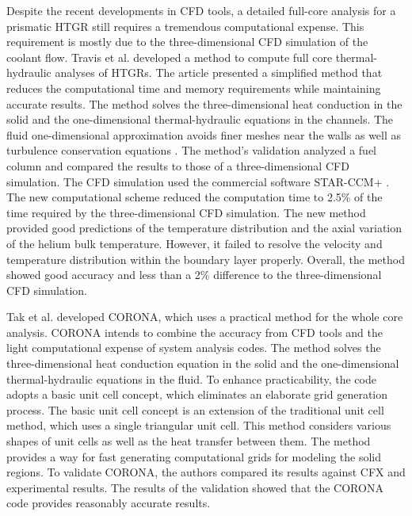 Despite the recent developments in CFD tools, a detailed full-core analysis for a prismatic \gls{HTGR} still requires a tremendous computational expense.
This requirement is mostly due to the three-dimensional CFD simulation of the coolant flow.
Travis et al. \cite{travis_thermalhydraulics_2013} developed a method to compute full core thermal-hydraulic analyses of \glspl{HTGR}.
The article presented a simplified method that reduces the computational time and memory requirements while maintaining accurate results.
The method solves the three-dimensional heat conduction in the solid and the one-dimensional thermal-hydraulic equations in the channels.
The fluid one-dimensional approximation avoids finer meshes near the walls as well as turbulence conservation equations \cite{tak_development_2014}.
The method's validation analyzed a fuel column and compared the results to those of a three-dimensional CFD simulation.
The CFD simulation used the commercial software STAR-CCM+ \cite{cd-adapco_star-ccm_2012}.
The new computational scheme reduced the computation time to 2.5\% of the time required by the three-dimensional CFD simulation.
The new method provided good predictions of the temperature distribution and the axial variation of the helium bulk temperature.
However, it failed to resolve the velocity and temperature distribution within the boundary layer properly.
Overall, the method showed good accuracy and less than a 2\% difference to the three-dimensional CFD simulation.

Tak et al. \cite{tak_practical_2012} \cite{tak_development_2014} developed CORONA, which uses a practical method for the whole core analysis.
CORONA intends to combine the accuracy from CFD tools and the light computational expense of system analysis codes.
The method solves the three-dimensional heat conduction equation in the solid and the one-dimensional thermal-hydraulic equations in the fluid.
To enhance practicability, the code adopts a basic unit cell concept, which eliminates an elaborate grid generation process.
The basic unit cell concept is an extension of the traditional unit cell method, which uses a single triangular unit cell.
This method considers various shapes of unit cells as well as the heat transfer between them.
The method provides a way for fast generating computational grids for modeling the solid regions.
To validate CORONA, the authors compared its results against CFX and experimental results.
The results of the validation showed that the CORONA code provides reasonably accurate results.


